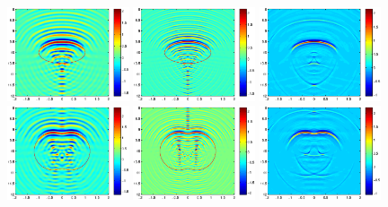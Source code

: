 \documentclass[12pt]{iopart}
\begin{document}
\begin{figure}
	\centering
	\includegraphics[width=0.32\textwidth]{./graphic/circle_3pi.eps}
	\includegraphics[width=0.32\textwidth]{./graphic/circle_5pi.eps}
	\includegraphics[width=0.32\textwidth]{./graphic/circle.eps}
	\includegraphics[width=0.32\textwidth]{./graphic/peanut_3pi.eps}
	\includegraphics[width=0.32\textwidth]{./graphic/peanut_5pi.eps}
	\includegraphics[width=0.32\textwidth]{./graphic/peanut.eps}

\end{figure}
\end{document}
